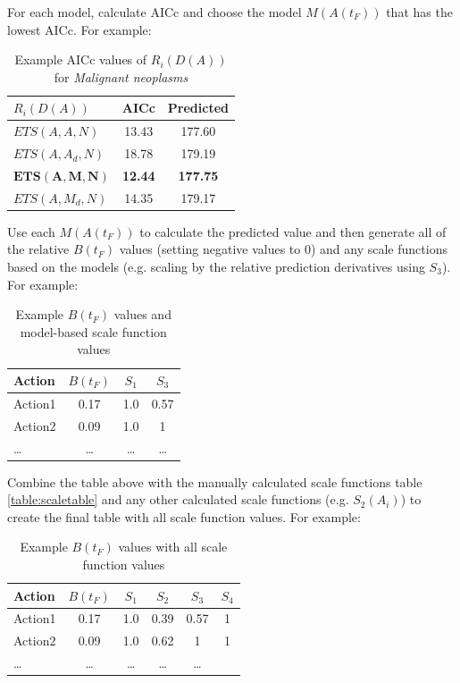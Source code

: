 \documentclass[12pt, a4paper, twocolumn]{article}
\begin{document}
For each model, calculate AICc and choose the model $M(A(t_F))$ that has the lowest AICc. For example:

\begin{table}[H]
  \centering
  \begin{tabular}{lcc}
    \toprule
      $R_i(D(A))$       & AICc           & Predicted       \\
    \midrule
      $ETS(A,A,N)$      & 13.43          & 177.60          \\
      $ETS(A,A_d,N)$    & 18.78          & 179.19          \\
      $\bm{ETS(A,M,N)}$ & \textbf{12.44} & \textbf{177.75} \\
      $ETS(A,M_d,N)$    & 14.35          & 179.17          \\
    \bottomrule
  \end{tabular}
  \caption{Example AICc values of $R_i(D(A))$ for \textit{Malignant neoplasms}}
  \label{table:choosem}
\end{table}

Use each $M(A(t_F))$ to calculate the predicted value and then generate all of the relative $B(t_F)$ values (setting negative values to 0) and any scale functions based on the models (e.g. scaling by the relative prediction derivatives using $S_3$). For example:

\begin{table}[H]
  \centering
  \begin{tabular}{lccc}
    \toprule
      Action  & $B(t_F)$ & $S_1$  & $S_3$  \\
    \midrule
      Action1 & 0.17     & 1.0    & 0.57   \\
      Action2 & 0.09     & 1.0    & 1      \\
      \ldots  & \ldots   & \ldots & \ldots \\
    \bottomrule
  \end{tabular}
  \caption{Example $B(t_F)$ values and model-based scale function values}
  \label{table:btable}
\end{table}

Combine the table above with the manually calculated scale functions table \ref{table:scaletable} and any other calculated scale functions (e.g. $S_2(A_i)$) to create the final table with all scale function values. For example:

\begin{table}[H]
  \centering
  \begin{tabular}{lccccc}
    \toprule
      Action  & $B(t_F)$ & $S_1$  & $S_2$  & $S_3$  & $S_4$  \\
    \midrule
      Action1 & 0.17     & 1.0    & 0.39   & 0.57   & 1      \\
      Action2 & 0.09     & 1.0    & 0.62   & 1      & 1      \\
      \ldots  & \ldots   & \ldots & \ldots & \ldots \\
    \bottomrule
  \end{tabular}
  \caption{Example $B(t_F)$ values with all scale function values}
  \label{table:btablewithall}
\end{table}
\end{document}
